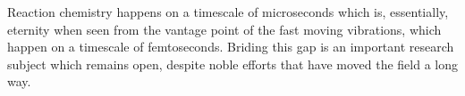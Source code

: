 Reaction chemistry happens on a timescale of microseconds which is, essentially, eternity when seen from the vantage point of the fast moving vibrations, which happen on a timescale of femtoseconds.
Briding this gap is an important research subject which remains open, despite noble efforts that have moved the field a long way\citemiss.



%




